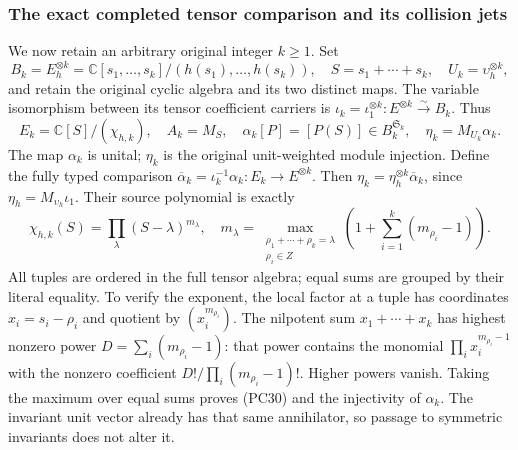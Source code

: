 \subsubsection{The exact completed tensor comparison and its collision jets}

We now retain an arbitrary original integer $k\ge1$.  Set
\[
 B_k=E_h^{\otimes k}
  =\mathbb C[s_1,\ldots,s_k]/(h(s_1),\ldots,h(s_k)),\quad
 S=s_1+\cdots+s_k,\quad U_k=\upsilon_h^{\otimes k},
 \tag{PC28}
\]
and retain the original cyclic algebra and its two distinct maps.
The variable isomorphism between its tensor coefficient carriers is
$\iota_k=\iota_1^{\otimes k}:E^{\otimes k}\xrightarrow{\sim}B_k$.
Thus
\[
 E_k=\mathbb C[S]/(\chi_{h,k}),\quad A_k=M_S,\quad
 \alpha_k[P]=[P(S)]\in B_k^{\mathfrak S_k},\quad
 \eta_k=M_{U_k}\alpha_k.
 \tag{PC29}
\]
The map $\alpha_k$ is unital; $\eta_k$ is the original unit-weighted
module injection.  Define the fully typed comparison
$\overline\alpha_k=\iota_k^{-1}\alpha_k:E_k\to E^{\otimes k}$.
Then $\eta_k=\eta_h^{\otimes k}\overline\alpha_k$, since
$\eta_h=M_{\upsilon_h}\iota_1$.  Their source polynomial is exactly
\[
 \chi_{h,k}(S)=\prod_\lambda(S-\lambda)^{m_\lambda},\quad
 m_\lambda=\max_{\substack{\rho_1+\cdots+\rho_k=\lambda\\\rho_i\in Z}}
          \left(1+\sum_{i=1}^k(m_{\rho_i}-1)\right).
 \tag{PC30}
\]
All tuples are ordered in the full tensor algebra; equal sums are
grouped by their literal equality.  To verify the exponent, the local
factor at a tuple has coordinates $x_i=s_i-\rho_i$ and quotient
by $(x_i^{m_{\rho_i}})$.  The nilpotent sum
$x_1+\cdots+x_k$ has highest nonzero power
$D=\sum_i(m_{\rho_i}-1)$: that power contains the monomial
$\prod_i x_i^{m_{\rho_i}-1}$ with the nonzero coefficient
$D!/\prod_i(m_{\rho_i}-1)!$.  Higher powers vanish.  Taking the
maximum over equal sums proves (PC30) and the injectivity of
$\alpha_k$.  The invariant unit vector already has that same
annihilator, so passage to symmetric invariants does not alter it.

